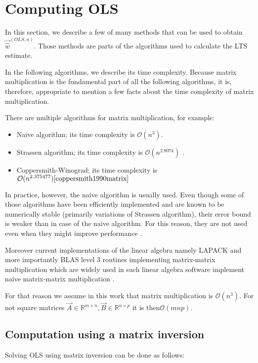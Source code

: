 \section{Computing OLS}
In this section, we describe a few of many methods that can be used to obtain  $\vec{\hat{w}}^{(OLS,n)}$. Those methods are parts of the algorithms used to calculate the LTS estimate. 

In the following algorithms, we describe its time complexity. Because matrix multiplication is the fundamental part of all the following algorithms, it is, therefore, appropriate to mention a few facts about the time complexity of matrix multiplication. 

There are multiple algorithms for matrix multiplication, for example:
\begin{itemize}
  \item Naive algorithm; its time complexity is $\mathcal{O}(n^{3})$.
  \item Strassen algorithm; its time complexity is $\mathcal{O} (n^{2.8074})$ \cite{strassen1969gaussian}. 
  \item Coppersmith-Winograd; its time complexity is $\mathcal {O}(n^{2.375477}) \cite{coppersmith1990matrix}$
\end{itemize}

In practice, however, the naive algorithm is usually used. Even though some of those algorithms have been efficiently implemented and are known to be numerically stable (primarily variations of Strassen algorithm), their error bound is weaker than in case of the naive algorithm. For this reason, they are not used even when they might improve performance \cite{ballard2015improving}.

Moreover current implementations of the linear algebra namely LAPACK and more importantly BLAS level 3 routines implementing matrix-matrix multiplication which are widely used in such linear algebra software implement naive matrix-matrix multiplication \cite{laug}. 

For that reason we assume in this work that matrix multiplication is  $\mathcal{O}(n^{3})$. For not square matrices $ \vec{A} \in \mathbb{R}^{m \times n}, \vec{B} \in \mathbb{R}^{n\times p}$ it is then$ \mathcal{O}(mnp)$.



\subsection{Computation using a matrix inversion}
Solving OLS using matrix inversion can be done as follows:

